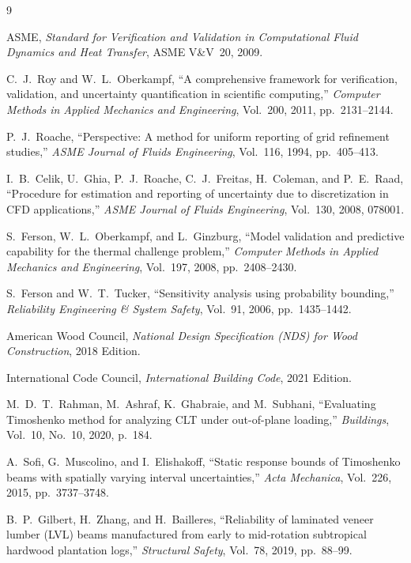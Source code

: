 \documentclass[10pt,twocolumn]{article}
\begin{document}

\begin{thebibliography}{9}

ASME,
\textit{Standard for Verification and Validation in Computational Fluid
  Dynamics and Heat Transfer}, ASME V\&V~20, 2009.

C.~J.~Roy and W.~L.~Oberkampf,
``A comprehensive framework for verification, validation, and uncertainty
  quantification in scientific computing,''
\textit{Computer Methods in Applied Mechanics and Engineering},
Vol.~200, 2011, pp.~2131--2144.

P.~J.~Roache,
``Perspective: A method for uniform reporting of grid refinement studies,''
\textit{ASME Journal of Fluids Engineering},
Vol.~116, 1994, pp.~405--413.

I.~B.~Celik, U.~Ghia, P.~J.~Roache, C.~J.~Freitas, H.~Coleman, and P.~E.~Raad,
``Procedure for estimation and reporting of uncertainty due to discretization
  in CFD applications,''
\textit{ASME Journal of Fluids Engineering}, Vol.~130, 2008, 078001.

S.~Ferson, W.~L.~Oberkampf, and L.~Ginzburg,
``Model validation and predictive capability for the thermal challenge problem,''
\textit{Computer Methods in Applied Mechanics and Engineering},
Vol.~197, 2008, pp.~2408--2430.

S.~Ferson and W.~T.~Tucker,
``Sensitivity analysis using probability bounding,''
\textit{Reliability Engineering \& System Safety},
Vol.~91, 2006, pp.~1435--1442.

American Wood Council,
\textit{National Design Specification (NDS) for Wood Construction},
2018 Edition.

International Code Council,
\textit{International Building Code}, 2021 Edition.

M.~D.~T.~Rahman, M.~Ashraf, K.~Ghabraie, and M.~Subhani,
``Evaluating Timoshenko method for analyzing CLT under out-of-plane
  loading,''
\textit{Buildings}, Vol.~10, No.~10, 2020, p.~184.

A.~Sofi, G.~Muscolino, and I.~Elishakoff,
``Static response bounds of Timoshenko beams with spatially varying
  interval uncertainties,''
\textit{Acta Mechanica}, Vol.~226, 2015, pp.~3737--3748.

B.~P.~Gilbert, H.~Zhang, and H.~Bailleres,
``Reliability of laminated veneer lumber (LVL) beams manufactured from
  early to mid-rotation subtropical hardwood plantation logs,''
\textit{Structural Safety}, Vol.~78, 2019, pp.~88--99.


\end{thebibliography}
\end{document}
